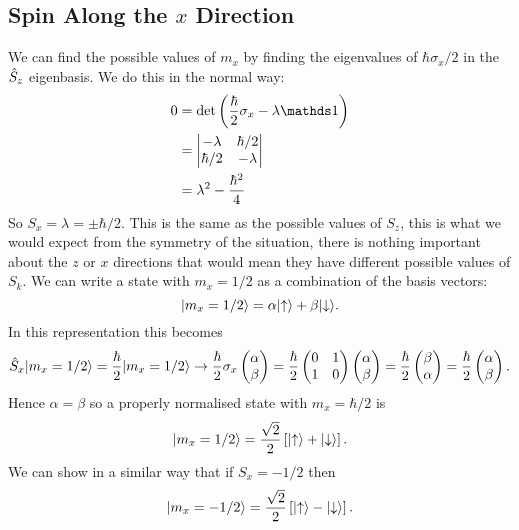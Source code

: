 \subsection{Spin Along the \texorpdfstring{\(x\)}{x} Direction}
We can find the possible values of \(m_x\) by finding the eigenvalues of \(\hbar\sigma_x/2\) in the \(\hat{S}_z\) eigenbasis.
We do this in the normal way:
\begin{align*}
    0 &= \det\left(\frac{\hbar}{2}\sigma_x - \lambda\ident\right)\\
    &= 
    \begin{vmatrix}
        -\lambda & \hbar/2\\
        \hbar/2 & -\lambda
    \end{vmatrix}
    \\
    &= \lambda^2 - \frac{\hbar^2}{4}
\end{align*}
So \(S_x = \lambda = \pm \hbar/2\).
This is the same as the possible values of \(S_z\), this is what we would expect from the symmetry of the situation, there is nothing important about the \(z\) or \(x\) directions that would mean they have different possible values of \(S_k\).
We can write a state with \(m_x = 1/2\) as a combination of the basis vectors:
\[\vert {m_x = 1/2} \rangle = \alpha\vert {\uparrow} \rangle + \beta\vert {\downarrow} \rangle.\]
In this representation this becomes
\[
\hat{S}_x\vert {m_x = 1/2} \rangle = \frac{\hbar}{2}\vert {m_x = 1/2} \rangle \mathrel{\rightarrow} \frac{\hbar}{2}\sigma_x
\begin{pmatrix}
    \alpha\\ \beta
\end{pmatrix}
=
\frac{\hbar}{2}
\begin{pmatrix}
    0 & 1\\
    1 & 0
\end{pmatrix}
\begin{pmatrix}
    \alpha\\ \beta
\end{pmatrix}
= \frac{\hbar}{2}
\begin{pmatrix}
    \beta\\ \alpha
\end{pmatrix}
= \frac{\hbar}{2}
\begin{pmatrix}
    \alpha\\ \beta
\end{pmatrix}
.
\]
Hence \(\alpha = \beta\) so a properly normalised state with \(m_x = \hbar/2\) is
\[\vert {m_x = 1/2} \rangle = \frac{\sqrt{2}}{2}\left[\vert {\uparrow} \rangle + \vert {\downarrow} \rangle\right].\]
We can show in a similar way that if \(S_x = -1/2\) then
\[\vert {m_x = -1/2} \rangle = \frac{\sqrt{2}}{2}\left[\vert {\uparrow} \rangle - \vert {\downarrow} \rangle\right].\]

